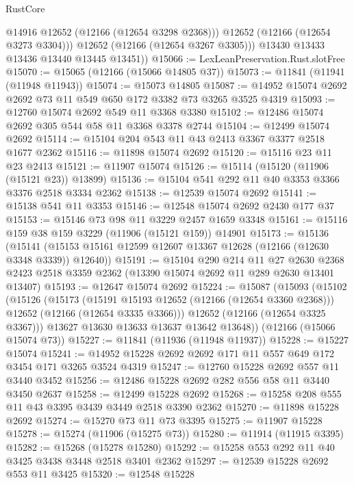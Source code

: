 \begin{lexlean}{RustCore}
\begin{coremodule}
              @14916
              @12652
              (@12166 (@12654 @3298 @2368)))
            @12652
            (@12166 (@12654 @3273 @3304)))
          @12652
          (@12166 (@12654 @3267 @3305)))
        @13430
        @13433
        @13436
        @13440
        @13445
        @13451))
@15066 := LexLeanPreservation.Rust.slotFree
@15070 := @15065 (@12166 (@15066 @14805 @37))
@15073 := @11841 (@11941 (@11948 @11943))
@15074 := @15073 @14805
@15087 := @14952 @15074 @2692 @2692 @73 @11 @549 @650 @172 @3382 @73 @3265 @3525 @4319
@15093 := @12760 @15074 @2692 @549 @11 @3368 @3380
@15102 := @12486 @15074 @2692 @305 @544 @58 @11 @3368 @3378 @2744
@15104 := @12499 @15074 @2692
@15114 := @15104 @204 @543 @11 @43 @2413 @3367 @3377 @2518 @1677 @2362
@15116 := @11898 @15074 @2692
@15120 := @15116 @23 @11 @23 @2413
@15121 := @11907 @15074
@15126 := @15114 (@15120 (@11906 (@15121 @23)) @13899)
@15136 := @15104 @541 @292 @11 @40 @3353 @3366 @3376 @2518 @3334 @2362
@15138 := @12539 @15074 @2692
@15141 := @15138 @541 @11 @3353
@15146 := @12548 @15074 @2692 @2430 @177 @37
@15153 := @15146 @73 @98 @11 @3229 @2457 @1659 @3348
@15161 := @15116 @159 @38 @159 @3229 (@11906 (@15121 @159)) @14901
@15173 := @15136
    (@15141 (@15153 @15161 @12599 @12607 @13367 @12628 (@12166 (@12630 @3348 @3339)) @12640))
@15191 := @15104
    @290
    @214
    @11
    @27
    @2630
    @2368
    @2423
    @2518
    @3359
    @2362
    (@13390 @15074 @2692 @11 @289 @2630 @13401 @13407)
@15193 := @12647 @15074 @2692
@15224 := @15087
    (@15093
      (@15102
        (@15126
          (@15173
            (@15191 @15193 @12652 (@12166 (@12654 @3360 @2368)))
            @12652
            (@12166 (@12654 @3335 @3366)))
          @12652
          (@12166 (@12654 @3325 @3367)))
        @13627
        @13630
        @13633
        @13637
        @13642
        @13648))
    (@12166 (@15066 @15074 @73))
@15227 := @11841 (@11936 (@11948 @11937))
@15228 := @15227 @15074
@15241 := @14952 @15228 @2692 @2692 @171 @11 @557 @649 @172 @3454 @171 @3265 @3524 @4319
@15247 := @12760 @15228 @2692 @557 @11 @3440 @3452
@15256 := @12486 @15228 @2692 @282 @556 @58 @11 @3440 @3450 @2637
@15258 := @12499 @15228 @2692
@15268 := @15258 @208 @555 @11 @43 @3395 @3439 @3449 @2518 @3390 @2362
@15270 := @11898 @15228 @2692
@15274 := @15270 @73 @11 @73 @3395
@15275 := @11907 @15228
@15278 := @15274 (@11906 (@15275 @73))
@15280 := @11914 (@11915 @3395)
@15282 := @15268 (@15278 @15280)
@15292 := @15258 @553 @292 @11 @40 @3425 @3438 @3448 @2518 @3401 @2362
@15297 := @12539 @15228 @2692 @553 @11 @3425
@15320 := @12548
    @15228

\end{coremodule}
\end{lexlean}
